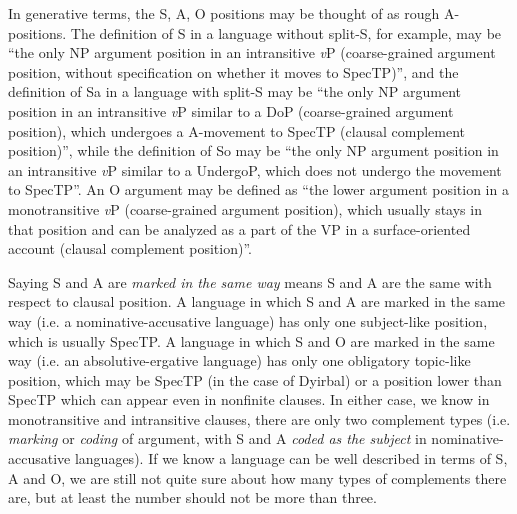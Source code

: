 \documentclass{article}
\newcommand*{\term}[1]{\emph{#1}}
\newcommand*{\vP}{\textit{v}P}
\begin{document}
In generative terms, the S, A, O positions may be thought of as rough A-positions. 
The definition of S in a language without split-S, for example, may be 
``the only NP argument position in an intransitive \vP{}
(coarse-grained argument position, without specification on whether it moves to SpecTP)'',
and the definition of Sa in a language with split-S may be 
``the only NP argument position in an intransitive \vP{} similar to a DoP (coarse-grained argument position),
which undergoes a A-movement to SpecTP (clausal complement position)'',
while the definition of So may be 
``the only NP argument position in an intransitive \vP{} similar to a UndergoP,
which does not undergo the movement to SpecTP''.
An O argument may be defined as ``the lower argument position in a monotransitive \vP{} 
(coarse-grained argument position),
which usually stays in that position and can be analyzed as a part of the VP in a surface-oriented account
(clausal complement position)''.

Saying S and A are \term{marked in the same way} means S and A are the same with respect to clausal position.
A language in which S and A are marked in the same way (i.e. a nominative-accusative language)
has only one subject-like position, which is usually SpecTP.
A language in which S and O are marked in the same way (i.e. an absolutive-ergative language)
has only one obligatory topic-like position,
which may be SpecTP (in the case of Dyirbal) 
or a position lower than SpecTP which can appear even in nonfinite clauses.
In either case, we know in monotransitive and intransitive clauses,
there are only two complement types (i.e. \term{marking} or \term{coding} of argument,
with S and A \term{coded as the subject} in nominative-accusative languages).
If we know a language can be well described in terms of S, A and O,
we are still not quite sure about how many types of complements there are,
but at least the number should not be more than three.
\end{document}
